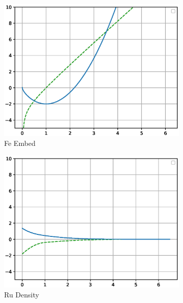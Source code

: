 \begin{figure}[htb]
\begin{subfigure}{.32\textwidth}
  \includegraphics[width=.94\linewidth]{chapters/potentials_fe_pd_ru/feru_potential/function_plots/fe_embe.eps}  
  \caption{Fe Embed}
  \label{fig:feru-fe-embe}
\end{subfigure}
\begin{subfigure}{.32\textwidth}
  \centering
  \includegraphics[width=.94\linewidth]{chapters/potentials_fe_pd_ru/feru_potential/function_plots/ru_dens.eps}  
  \caption{Ru Density}
  \label{fig:feru-ru-dens}
\end{subfigure}
\begin{subfigure}{.32\textwidth}
  \centering

\end{subfigure}
\end{figure}
